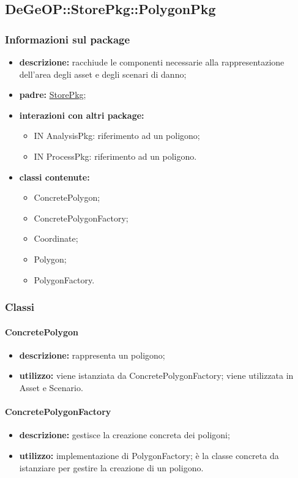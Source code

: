 \subsection{DeGeOP::StorePkg::PolygonPkg}
\label{pkg::PolygonPkg}
\subsubsection{Informazioni sul package}
\begin{itemize}
	\item \textbf{descrizione:} racchiude le componenti necessarie alla rappresentazione dell'area degli asset e degli scenari di danno;
	\item \textbf{padre:} \hyperref[pkg::StorePkg]{StorePkg};
	\item \textbf{interazioni con altri package:} 
	\begin{itemize}
		\item IN AnalysisPkg: riferimento ad un poligono;
		\item IN ProcessPkg: riferimento ad un poligono.
	\end{itemize}
	\item \textbf{classi contenute:}
	\begin{itemize}
		\item ConcretePolygon;
		\item ConcretePolygonFactory;
		\item Coordinate;
		\item Polygon;
		\item PolygonFactory.
	\end{itemize}
\end{itemize}
\subsubsection{Classi}
\paragraph{ConcretePolygon}
\begin{itemize}
	\item \textbf{descrizione:} rappresenta un poligono;
	\item \textbf{utilizzo:} viene istanziata da ConcretePolygonFactory; viene utilizzata in Asset e Scenario.
\end{itemize}
\paragraph{ConcretePolygonFactory}
\begin{itemize}
	\item \textbf{descrizione:} gestisce la creazione concreta dei poligoni;
	\item \textbf{utilizzo:} implementazione di PolygonFactory; è la classe concreta da istanziare per gestire la creazione di un poligono.
\end{itemize}
